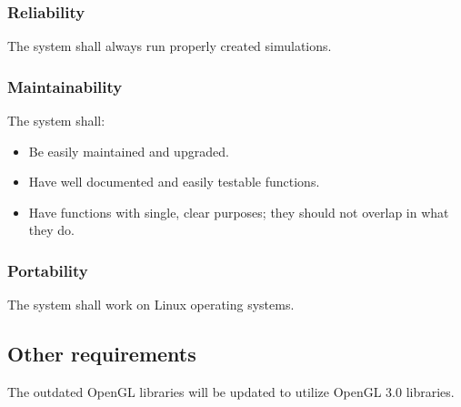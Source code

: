 \documentclass[10pt,journal,compsoc,draftclsnofoot]{IEEEtran}
\begin{document}
\begin{flushleft}
\subsubsection{Reliability}
\vspace{5mm}
The system shall always run properly created simulations.


\subsubsection{Maintainability}
\vspace{3mm}
The system shall:
\begin{itemize}
\item Be easily maintained and upgraded. 
\item Have well documented and easily testable functions.
\item Have functions with single, clear purposes; they should not overlap in what they do.
\end{itemize}

\subsubsection{Portability}
\vspace{3mm}
The system shall work on Linux operating systems.

\subsection{Other requirements}
\vspace{3mm}
The outdated OpenGL libraries will be updated to utilize OpenGL 3.0 libraries.

\vfill

\newpage

\begin{landscape}

\end{landscape}
\end{flushleft}
\end{document}
